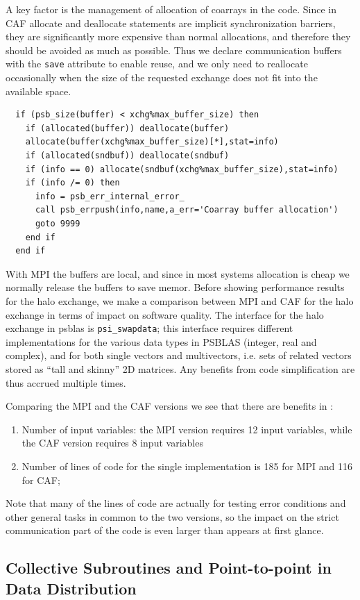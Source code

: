 \documentclass{IOS-Book-Article}
\begin{document}
A key factor is the management of  allocation of coarrays in the
code. Since in CAF allocate and deallocate statements are implicit
synchronization barriers, they are significantly more expensive than
normal allocations, and therefore  they should be
avoided as much as possible.  Thus we declare communication
buffers with the \verb|save| attribute to enable reuse, and we only
need to reallocate occasionally when the size of the requested
exchange does not fit into the available space. 
\lstset{language=Fortran} 
\begin{lstlisting}
  if (psb_size(buffer) < xchg%max_buffer_size) then
    if (allocated(buffer)) deallocate(buffer)
    allocate(buffer(xchg%max_buffer_size)[*],stat=info)
    if (allocated(sndbuf)) deallocate(sndbuf)
    if (info == 0) allocate(sndbuf(xchg%max_buffer_size),stat=info)
    if (info /= 0) then
      info = psb_err_internal_error_
      call psb_errpush(info,name,a_err='Coarray buffer allocation')
      goto 9999
    end if
  end if
\end{lstlisting}
 With MPI the buffers are local, and since in most systems allocation
 is cheap we normally release the buffers to save memor.
Before showing performance results for  the halo exchange, we 
make a comparison between MPI and CAF for the halo exchange in terms
of impact on software quality.  
The interface for the halo exchange in psblas is \verb|psi_swapdata|;
this interface requires different implementations for the various data
types  in PSBLAS (integer, real and complex), and  for both single
vectors and multivectors, i.e. sets of related vectors stored as
``tall and skinny'' 2D matrices. Any benefits from code simplification
are thus accrued multiple times.

Comparing the  MPI and the CAF versions we see that there are benefits
in : 
\begin{enumerate}
\item Number of input variables: the MPI version requires 12 input
  variables, while the CAF version requires 8 input variables 
\item Number of lines of code for the single implementation is 185 for
  MPI and 116 for CAF;  
\end{enumerate}
Note that many of the lines of code are actually for testing error
conditions and other general tasks in common to the two versions, so
the impact on the strict communication part of the code is even larger
than appears at first glance. 
  
\subsection{Collective Subroutines and Point-to-point in Data Distribution}
\end{document}
